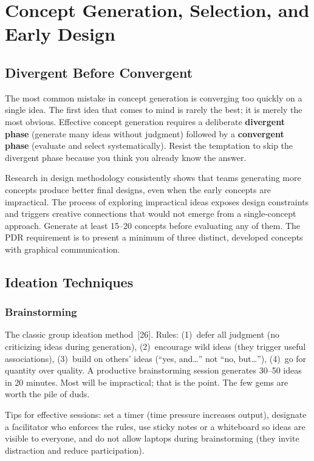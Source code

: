 \chapter{Concept Generation, Selection, and Early Design}

\section{Divergent Before Convergent}
The most common mistake in concept generation is converging too quickly on a single idea. The first idea that comes to mind is rarely the best; it is merely the most obvious. Effective concept generation requires a deliberate \textbf{divergent phase} (generate many ideas without judgment) followed by a \textbf{convergent phase} (evaluate and select systematically). Resist the temptation to skip the divergent phase because you think you already know the answer.

Research in design methodology consistently shows that teams generating more concepts produce better final designs, even when the early concepts are impractical. The process of exploring impractical ideas exposes design constraints and triggers creative connections that would not emerge from a single-concept approach. Generate at least 15--20 concepts before evaluating any of them. The PDR requirement is to present a minimum of three distinct, developed concepts with graphical communication.

\section{Ideation Techniques}

\subsection{Brainstorming}
The classic group ideation method~[26]. Rules: (1)~defer all judgment (no criticizing ideas during generation), (2)~encourage wild ideas (they trigger useful associations), (3)~build on others' ideas (``yes, and\ldots'' not ``no, but\ldots''), (4)~go for quantity over quality. A productive brainstorming session generates 30--50 ideas in 20 minutes. Most will be impractical; that is the point. The few gems are worth the pile of duds.

Tips for effective sessions: set a timer (time pressure increases output), designate a facilitator who enforces the rules, use sticky notes or a whiteboard so ideas are visible to everyone, and do not allow laptops during brainstorming (they invite distraction and reduce participation).

